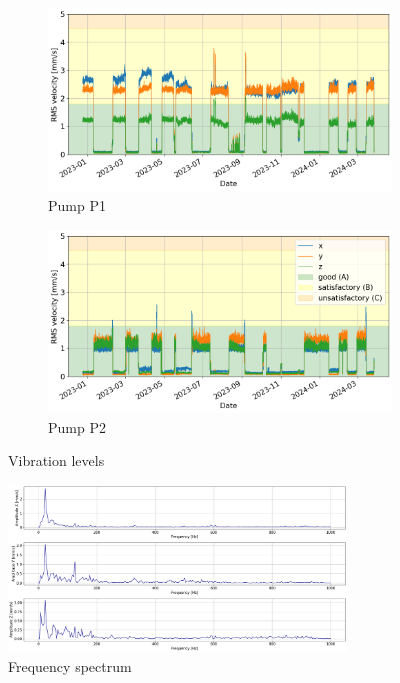 \begin{figure}[h]
    \centering
    \begin{subfigure}[b]{0.49\textwidth}
        \includegraphics[width=\textwidth]{assets/results/ksb-cloud/p1.png}
        \caption{Pump P1}
    \end{subfigure}
    \hfill
    \begin{subfigure}[b]{0.49\textwidth}
        \includegraphics[width=\textwidth]{assets/results/ksb-cloud/p2.png}
        \caption{Pump P2}
    \end{subfigure}
    \caption{Vibration levels}
\end{figure}

\begin{figure}[h]
    \centering
    \includegraphics[width=0.8\textwidth]{assets/results/ksb-cloud/spectrum.png}
    \caption{Frequency spectrum}
\end{figure}


